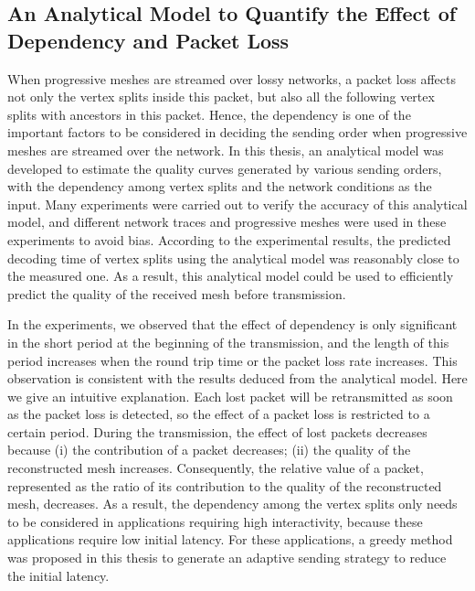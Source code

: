 \subsection{An Analytical Model to Quantify the Effect of Dependency and Packet Loss}
When progressive meshes are streamed over lossy networks, a packet loss affects
not only the vertex splits inside this packet, but also all the following vertex
splits with ancestors in this packet. Hence, the dependency is one of the important 
factors to be considered in deciding the sending order when progressive meshes are 
streamed over the network. In this thesis, an analytical model was developed 
to estimate the quality curves generated by various sending orders, with the dependency
among vertex splits and the network conditions as the input.
Many experiments were carried out to verify the accuracy of this analytical model, 
and different network traces and progressive meshes were used in these experiments
to avoid bias. 
According to the experimental results, 
the predicted decoding time of vertex splits using the analytical model 
was reasonably close to the measured one. 
As a result, this analytical model could be used to efficiently predict 
the quality of the received mesh before transmission. 

In the experiments, we observed that the effect of dependency
is only significant in the short period at the beginning of the transmission, 
and the length of this period increases when the round trip time or the packet loss rate increases. 
This observation is consistent with the results deduced from the analytical model. 
Here we give an intuitive explanation. 
Each lost packet will be retransmitted
as soon as the packet loss is detected, 
so the effect of a packet loss is restricted to a certain period. 
During the transmission, the effect of lost packets decreases 
because (i) the contribution of a packet decreases;
(ii) the quality of the reconstructed mesh increases. 
Consequently, the relative value of a packet, 
represented as the ratio of its contribution
to the quality of the reconstructed mesh, decreases.
As a result, the dependency among the vertex splits 
only needs to be considered in applications requiring high interactivity,
because these applications require low initial latency. 
For these applications, a greedy method was proposed in this thesis
to generate an adaptive sending strategy to reduce the initial latency. 

